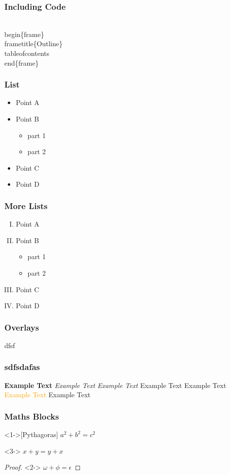 \documentclass{beamer}
\begin{document}
 \begin{frame}[fragile]
\frametitle{Including Code}
\begin{semiverbatim}
\\begin\{frame\}
\\frametitle\{Outline\}
\\tableofcontents
\\end\{frame\}
\end{semiverbatim}
\end{frame}

 
     
 \begin{frame}
\frametitle{List}
\begin{itemize}
\pause
\item Point A
\pause
\item Point B
\begin{itemize}
\pause
\item part 1
\pause
\item part 2
\end{itemize}
\pause
\item Point C
\pause
\item Point D
\end{itemize}
\end{frame}


\begin{frame}
\frametitle{More Lists}
\begin{enumerate}[(I)]
\item<1-> Point A
\item<2-> Point B
\begin{itemize}
\item<3-> part 1
\item<4-> part 2
\end{itemize}
\item<5-> Point C
\item<6-> Point D
\end{enumerate}
\end{frame}

\begin{frame}
\frametitle{Overlays}


\end{frame}


\begin{frame}{dfsf}
    
\frametitle{
sdfsdafas}
\textbf<2>{Example Text}
\textit<2>{Example Text}
\textsl<2>{Example Text}
\textrm<2>{Example Text}
\textsf<2>{Example Text}
\textcolor<2>{orange}{Example Text}
\alert<2>{Example Text}


\end{frame}
 
 \begin{frame}
\frametitle{Maths Blocks}
\begin{theorem}<1->[Pythagoras] 
$ a^2 + b^2 = c^2$
\end{theorem}
\begin{corollary}<3->
$ x + y = y + x  $
\end{corollary}
\begin{proof}<2->
$\omega +\phi = \epsilon $
\end{proof}
\end{frame}
 
\end{document}
